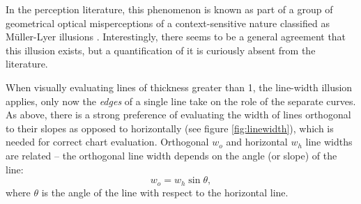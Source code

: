 In the perception literature, this phenomenon is known as part of a group of geometrical optical misperceptions of a context-sensitive nature classified as M\"uller-Lyer illusions \citep{day:1991}. Interestingly, there seems to be a general agreement that this illusion exists, but a quantification of it is curiously absent from the literature. 




%
%




When visually evaluating lines of thickness greater than 1, the line-width illusion applies, only now the {\it edges} of a single line  take on the role of the separate curves. %
As above, there is a strong preference of evaluating the width of lines orthogonal to their slopes as opposed to horizontally (see figure \ref{fig:linewidth}), which is needed for correct chart evaluation.
Orthogonal $w_o$ and horizontal $w_h$ line widths are related -- the orthogonal line width depends on the angle (or slope) of the line:
\begin{equation}\label{adjust}
w_o = w_h \sin \theta,
\end{equation}
where $\theta$ is the angle of the line with respect to the horizontal line.

